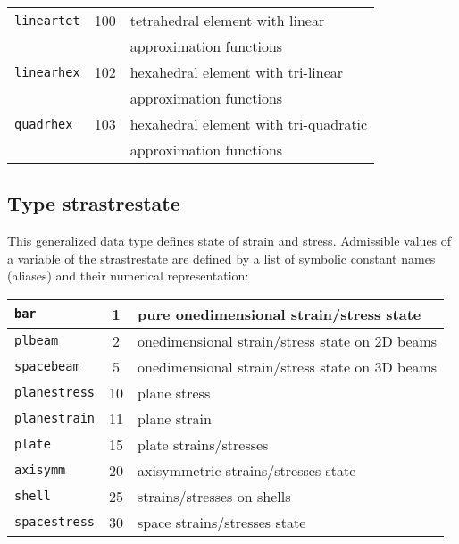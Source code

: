 \begin{center}
\begin{tabular}{|l|c|l|}
\hline
{\tt lineartet} & 100 & tetrahedral element with linear
\\
 & & approximation functions
\\ \hline
{\tt linearhex} & 102 & hexahedral element with tri-linear
\\
 & & approximation functions
\\ \hline
{\tt quadrhex} & 103 & hexahedral element with tri-quadratic
\\
 & & approximation functions
\\ \hline
\end{tabular}
\end{center}

\subsection{Type {\sf strastrestate}}
\label{sectstrastrestate}

This generalized data type defines state of strain and stress.
Admissible values of a variable of the {\sf strastrestate} are defined by a list of symbolic constant names (aliases)
and their numerical representation:

\begin{center}
\begin{tabular}{|l|c|l|}
\hline
{\tt bar} & 1 & pure onedimensional strain/stress state
\\ \hline
{\tt plbeam} & 2 & onedimensional strain/stress state on 2D beams
\\ \hline
{\tt spacebeam} & 5 & onedimensional strain/stress state on 3D beams
\\ \hline
{\tt planestress} & 10 & plane stress
\\ \hline
{\tt planestrain} & 11 & plane strain
\\ \hline
{\tt plate} & 15 & plate strains/stresses
\\ \hline
{\tt axisymm} & 20 & axisymmetric strains/stresses state
\\ \hline
{\tt shell} & 25 & strains/stresses on shells
\\ \hline
{\tt spacestress} & 30 & space strains/stresses state
\\ \hline
\end{tabular}
\end{center}

